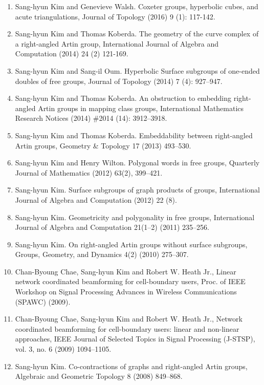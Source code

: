 \documentclass[11pt,a4paper]{article}
\begin{document}
\begin{enumerate}[leftmargin=1.5em, label=\arabic*.]
\item Sang-hyun Kim and Genevieve Walsh. Coxeter groups, hyperbolic cubes, and acute triangulations, Journal of Topology (2016) 9 (1): 117-142.
\item Sang-hyun Kim and Thomas Koberda. The geometry of the curve complex of a right-angled Artin group, International Journal of Algebra and Computation (2014) 24 (2) 121-169.
\item Sang-hyun Kim and Sang-il Oum. Hyperbolic Surface subgroups of one-ended doubles of free groups, Journal of Topology (2014) 7 (4): 927--947.
\item Sang-hyun Kim and Thomas Koberda. An obstruction to embedding right-angled Artin groups in mapping class groups, International Mathematics Research Notices (2014) \#2014 (14): 3912--3918.
\item Sang-hyun Kim and Thomas Koberda. Embeddability between right-angled Artin groups, Geometry \& Topology 17 (2013) 493--530.
\item Sang-hyun Kim and Henry Wilton. Polygonal words in free groups, Quarterly Journal of Mathematics (2012) 63(2), 399--421.
\item Sang-hyun Kim. Surface subgroups of graph products of groups, International Journal of Algebra and Computation (2012) 22 (8).
\item Sang-hyun Kim. Geometricity and polygonality in free groups, International Journal of Algebra and Computation 21(1--2) (2011) 235--256.
\item Sang-hyun Kim. On right-angled Artin groups without surface subgroups, Groups, Geometry, and Dynamics 4(2) (2010) 275--307.
\item Chan-Byoung Chae, Sang-hyun Kim and Robert W. Heath Jr., Linear network coordinated beamforming for cell-boundary users, Proc. of IEEE Workshop on Signal Processing Advances in Wireless Communications (SPAWC) (2009).
\item Chan-Byoung Chae, Sang-hyun Kim and Robert W. Heath Jr., Network coordinated beamforming for cell-boundary users: linear and non-linear approaches, IEEE Journal of Selected Topics in Signal Processing (J-STSP), vol. 3, no. 6 (2009) 1094--1105.
\item Sang-hyun Kim. Co-contractions of graphs and right-angled Artin groups, Algebraic and Geometric Topology 8 (2008) 849--868.
\end{enumerate}
\end{document}
